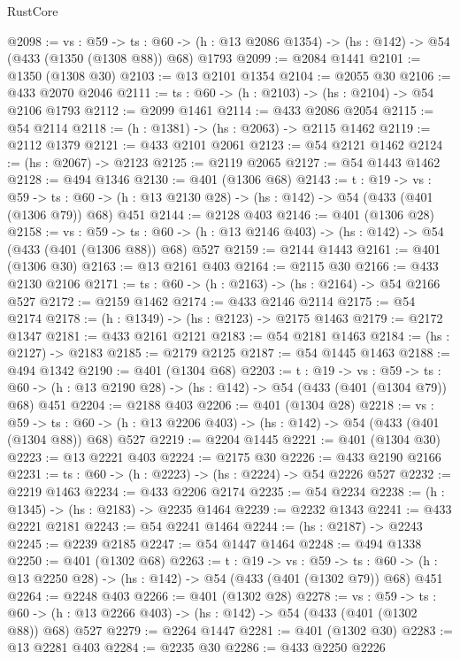 \begin{lexlean}{RustCore}
\begin{coremodule}
@2098 := {vs : @59} ->
  {ts : @60} -> (h : @13 @2086 @1354) -> (hs : @142) -> @54 (@433 (@1350 (@1308 @88)) @68) @1793
@2099 := @2084 @1441
@2101 := @1350 (@1308 @30)
@2103 := @13 @2101 @1354
@2104 := @2055 @30
@2106 := @433 @2070 @2046
@2111 := {ts : @60} -> (h : @2103) -> (hs : @2104) -> @54 @2106 @1793
@2112 := @2099 @1461
@2114 := @433 @2086 @2054
@2115 := @54 @2114
@2118 := (h : @1381) -> (hs : @2063) -> @2115 @1462
@2119 := @2112 @1379
@2121 := @433 @2101 @2061
@2123 := @54 @2121 @1462
@2124 := (hs : @2067) -> @2123
@2125 := @2119 @2065
@2127 := @54 @1443 @1462
@2128 := @494 @1346
@2130 := @401 (@1306 @68)
@2143 := {t : @19} ->
  {vs : @59} ->
  {ts : @60} -> (h : @13 @2130 @28) -> (hs : @142) -> @54 (@433 (@401 (@1306 @79)) @68) @451
@2144 := @2128 @403
@2146 := @401 (@1306 @28)
@2158 := {vs : @59} ->
  {ts : @60} -> (h : @13 @2146 @403) -> (hs : @142) -> @54 (@433 (@401 (@1306 @88)) @68) @527
@2159 := @2144 @1443
@2161 := @401 (@1306 @30)
@2163 := @13 @2161 @403
@2164 := @2115 @30
@2166 := @433 @2130 @2106
@2171 := {ts : @60} -> (h : @2163) -> (hs : @2164) -> @54 @2166 @527
@2172 := @2159 @1462
@2174 := @433 @2146 @2114
@2175 := @54 @2174
@2178 := (h : @1349) -> (hs : @2123) -> @2175 @1463
@2179 := @2172 @1347
@2181 := @433 @2161 @2121
@2183 := @54 @2181 @1463
@2184 := (hs : @2127) -> @2183
@2185 := @2179 @2125
@2187 := @54 @1445 @1463
@2188 := @494 @1342
@2190 := @401 (@1304 @68)
@2203 := {t : @19} ->
  {vs : @59} ->
  {ts : @60} -> (h : @13 @2190 @28) -> (hs : @142) -> @54 (@433 (@401 (@1304 @79)) @68) @451
@2204 := @2188 @403
@2206 := @401 (@1304 @28)
@2218 := {vs : @59} ->
  {ts : @60} -> (h : @13 @2206 @403) -> (hs : @142) -> @54 (@433 (@401 (@1304 @88)) @68) @527
@2219 := @2204 @1445
@2221 := @401 (@1304 @30)
@2223 := @13 @2221 @403
@2224 := @2175 @30
@2226 := @433 @2190 @2166
@2231 := {ts : @60} -> (h : @2223) -> (hs : @2224) -> @54 @2226 @527
@2232 := @2219 @1463
@2234 := @433 @2206 @2174
@2235 := @54 @2234
@2238 := (h : @1345) -> (hs : @2183) -> @2235 @1464
@2239 := @2232 @1343
@2241 := @433 @2221 @2181
@2243 := @54 @2241 @1464
@2244 := (hs : @2187) -> @2243
@2245 := @2239 @2185
@2247 := @54 @1447 @1464
@2248 := @494 @1338
@2250 := @401 (@1302 @68)
@2263 := {t : @19} ->
  {vs : @59} ->
  {ts : @60} -> (h : @13 @2250 @28) -> (hs : @142) -> @54 (@433 (@401 (@1302 @79)) @68) @451
@2264 := @2248 @403
@2266 := @401 (@1302 @28)
@2278 := {vs : @59} ->
  {ts : @60} -> (h : @13 @2266 @403) -> (hs : @142) -> @54 (@433 (@401 (@1302 @88)) @68) @527
@2279 := @2264 @1447
@2281 := @401 (@1302 @30)
@2283 := @13 @2281 @403
@2284 := @2235 @30
@2286 := @433 @2250 @2226

\end{coremodule}
\end{lexlean}
